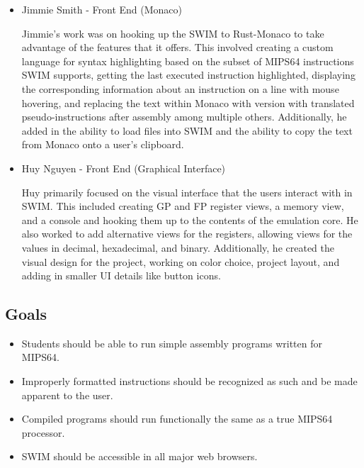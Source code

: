 \documentclass[
    paper=letter,
    parskip=half,
    fontsize=12pt,
    titlepage=firstiscover,
    toc=bibliography,
    numbers=endperiod
]{scrartcl}
\begin{document}
\begin{itemize}
    \item Jimmie Smith - Front End (Monaco)

          Jimmie's work was on hooking up the SWIM to Rust-Monaco to take
          advantage of the features that it offers. This involved creating a
          custom language for syntax highlighting based on the subset of MIPS64
          instructions SWIM supports, getting the last executed instruction
          highlighted, displaying the corresponding information about an
          instruction on a line with mouse hovering, and replacing the text within
          Monaco with version with translated pseudo-instructions after assembly
          among multiple others. Additionally, he added in the ability to load
          files into SWIM and the ability to copy the text from Monaco onto a
          user's clipboard.

    \item Huy Nguyen - Front End (Graphical Interface)

          Huy primarily focused on the visual interface that the users interact
          with in SWIM. This included creating GP and FP register views, a memory
          view, and a console and hooking them up to the contents of the emulation
          core. He also worked to add alternative views for the registers,
          allowing views for the values in decimal, hexadecimal, and binary.
          Additionally, he created the visual design for the project, working on
          color choice, project layout, and adding in smaller UI details like
          button icons.
\end{itemize}

\subsection{Goals}

\begin{itemize}
    \item Students should be able to run simple assembly programs written for
          MIPS64.
    \item Improperly formatted instructions should be recognized as such and be
          made apparent to the user.
    \item Compiled programs should run functionally the same as a true MIPS64
          processor.
    \item SWIM should be accessible in all major web browsers.
\end{itemize}
\end{document}
